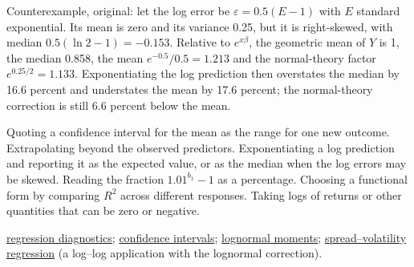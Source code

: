 \begin{qfmethod}
Counterexample, original: let the log error be $\varepsilon=0.5(E-1)$ with $E$ standard exponential. Its mean is zero and its variance 0.25, but it is right-skewed, with median $0.5(\ln2-1)=-0.153$. Relative to $e^{x\beta}$, the geometric mean of $Y$ is 1, the median 0.858, the mean $e^{-0.5}/0.5=1.213$ and the normal-theory factor $e^{0.25/2}=1.133$. Exponentiating the log prediction then overstates the median by 16.6 percent and understates the mean by 17.6 percent; the normal-theory correction is still 6.6 percent below the mean.

 Quoting a confidence interval for the mean as the range for one new outcome. Extrapolating beyond the observed predictors. Exponentiating a log prediction and reporting it as the expected value, or as the median when the log errors may be skewed. Reading the fraction $1.01^{b_1}-1$ as a percentage. Choosing a functional form by comparing $R^2$ across different responses. Taking logs of returns or other quantities that can be zero or negative.

 \hyperref[meth:regression-diagnostics-anova]{regression diagnostics}; \hyperref[meth:confidence-intervals]{confidence intervals}; \hyperref[def:financial-distributions]{lognormal moments}; \hyperref[meth:spread-volatility-regression]{spread--volatility regression} (a log--log application with the lognormal correction).

\end{qfmethod}
